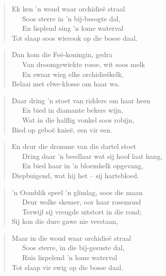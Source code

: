\begin{verse}
Ek ken ’n woud waar orchidie\"e straal \\
\ \ \ Soos sterre in ’n bij-besogte dal, \\
\ \ \ En lisplend sing ’n lome waterval \\
Tot slaap soos wierook op die bosse daal. \\
\end{verse}

\begin{verse}
Dan kom die Fe\"e-koningin, gedra \\
\ \ \ Van droomgewiekte rosse, wit soos melk \\
\ \ \ En swaar wieg elke orchidie\"ekelk, \\
Belaai met elwe-klosse om haar wa. \\
\end{verse}

\begin{verse}
Daar dring ’n stoet van ridders om haar heen \\
\ \ \ En bied in diamante bekers wijn, \\
\ \ \ Wat in die halflig vonkel soos robijn, \\
Bied op gebo\"e knie\"e, een vir een. \\
\end{verse}

\begin{verse}
En deur die dromme van die dartel stoet \\
\ \ \ Dring daar ’n beedlaar wat sij hoof laat hang, \\
\ \ \ En bied haar in ’n bloemkelk opgevang, \\
Diepbuigend, wat hij het -- sij hartebloed. \\
\end{verse}

\begin{verse}
’n Oomblik speel ’n glimlag, soos die maan \\
\ \ \ Deur wolke skemer, oor haar rosemond \\
\ \ \ Terwijl sij vreugde uitstort in die rond; \\
Sij kon die dure gawe nie verstaan, \\
\end{verse}

\begin{verse}
Maar in die woud waar orchidie\"e straal \\
\ \ \ Soos sterre, in die bij-gesuste dal, \\
\ \ \ Ruis lispelend ’n lome waterval \\
Tot slaap vir ewig op die bosse daal.
\end{verse}